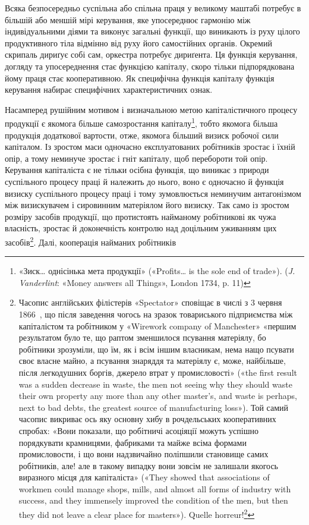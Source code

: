 Всяка безпосередньо суспільна або спільна праця у великому
маштабі потребує в більшій або меншій мірі керування, яке упосереднює
гармонію між індивідуальними діями та виконує загальні
функції, що виникають із руху цілого продуктивного тіла
відмінно від руху його самостійних органів. Окремий скрипаль
дириґує собі сам, оркестра потребує дириґента. Ця функція
керування, догляду та упосереднення стає функцією капіталу,
скоро тільки підпорядкована йому праця стає кооперативною.
Як специфічна функція капіталу функція керування набирає
специфічних характеристичних ознак.

Насамперед рушійним мотивом і визначальною метою капіталістичного
процесу продукції є якомога більше самозростання
капіталу\footnote{
«Зиск\dots{} однісінька мета продукції» («Profits\dots{} is the sole end
of trade»). (\emph{J. Vanderlint}: «Money answers all Things», London 1734,
p. 11)
}, тобто якомога більша продукція додаткової вартости,
отже, якомога більший визиск робочої сили капіталом. Із зростом
маси одночасно експлуатованих робітників зростає і їхній
опір, а тому неминуче зростає і гніт капіталу, щоб перебороти
той опір. Керування капіталіста є не тільки осібна функція, що
виникає з природи суспільного процесу праці й належить до нього,
воно є одночасно й функція визиску суспільного процесу праці
і тому зумовлюється неминучим антагонізмом між визискувачем
і сировинним матеріялом його визиску. Так само із зростом розміру
засобів продукції, що протистоять найманому робітникові
як чужа власність, зростає й доконечність контролю над доцільним
уживанням цих засобів\footnote{
Часопис англійських філістерів «Spectator» сповіщає в числі
з 3 червня 1866~, що після заведення чогось на зразок товариського підприємства
між капіталістом та робітником у «Wirework company of Manchester»
«першим результатом було те, що раптом зменшилося псування
матеріялу, бо робітники зрозуміли, що їм, як і всім іншим власникам,
нема нащо псувати своє власне майно, а псування знаряддя та матеріялу
є, може, найбільше, після легкодушних боргів, джерело втрат у промисловості»
(«the first result was a sudden decrease in waste, the men not seeing
why they should waste their own property any more than any other master’s,
and waste is perhaps, next to bad debts, the greatest source of manufacturing
loss»). Той самий часопис викриває ось яку основну хибу в рочдельських кооперативних
спробах: «Вони показали, що робітничі асоціяції можуть
успішно порядкувати крамницями, фабриками та майже всіма формами
промисловости, і що вони надзвичайно поліпшили становище самих робітників,
але! але в такому випадку вони зовсім не залишали якогось виразного
місця для капіталіста» («They showed that associations of workmen
could manage shops, mills, and almost all forms of industry with success,
and they immensely improved the condition of the men, but then they did
not leave a clear place for masters»). Quelle horreur!\footnote*{
Який жах! \emph{Ред.}
}
}. Далі, кооперація найманих робітників
